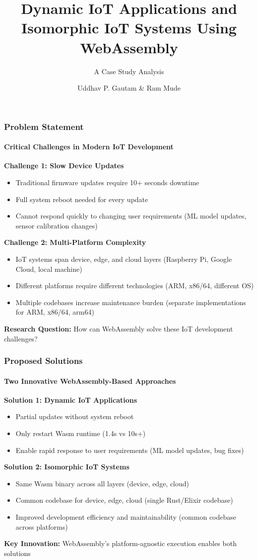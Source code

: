 \documentclass{beamer}
\title{Dynamic IoT Applications and Isomorphic IoT Systems Using WebAssembly}
\subtitle{A Case Study Analysis}
\author{Uddhav P. Gautam \& Ram Mude}
\institute{ECE 4984/5984 IoT System Design\\Virginia Tech}
\date{}
\begin{document}
\begin{frame}
\titlepage
\end{frame}

\begin{frame}
\frametitle{Problem Statement}
\framesubtitle{Critical Challenges in Modern IoT Development}

\textbf{Challenge 1: Slow Device Updates}
\begin{itemize}
\item Traditional firmware updates require 10+ seconds downtime
\item Full system reboot needed for every update
\item Cannot respond quickly to changing user requirements (ML model updates, sensor calibration changes)
\end{itemize}

\textbf{Challenge 2: Multi-Platform Complexity}
\begin{itemize}
\item IoT systems span device, edge, and cloud layers (Raspberry Pi, Google Cloud, local machine)
\item Different platforms require different technologies (ARM, x86/64, different OS)
\item Multiple codebases increase maintenance burden (separate implementations for ARM, x86/64, arm64)
\end{itemize}

\textbf{Research Question:} How can WebAssembly solve these IoT development challenges?
\end{frame}

\begin{frame}
    \frametitle{Proposed Solutions}
    \framesubtitle{Two Innovative WebAssembly-Based Approaches}
    
    \textbf{Solution 1: Dynamic IoT Applications}
    \begin{itemize}
    \item Partial updates without system reboot
    \item Only restart Wasm runtime (1.4s vs 10s+)
    \item Enable rapid response to user requirements (ML model updates, bug fixes)
    \end{itemize}
    
    \textbf{Solution 2: Isomorphic IoT Systems}
    \begin{itemize}
    \item Same Wasm binary across all layers (device, edge, cloud)
    \item Common codebase for device, edge, cloud (single Rust/Elixir codebase)
    \item Improved development efficiency and maintainability (common codebase across platforms)
    \end{itemize}
    
    \textbf{Key Innovation:} WebAssembly's platform-agnostic execution enables both solutions
    \end{frame}
\end{document}
